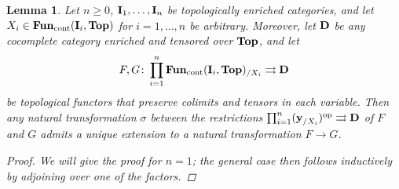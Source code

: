 \documentclass[reqno]{memo-l}
\theoremstyle{mythm}
\newtheorem{lemma}[thm]{Lemma}
\theoremstyle{definition}
\numberwithin{equation}{section}
\newcommand{\cat}[1]{\textbf{\textup{#1}}}
\newcommand{\op}{{\textup{op}}}
\newcommand{\cont}{\textup{cont}}
\begin{document}
\begin{lemma}\label{lemma:extend-nat-trafo}
    Let $n\ge0$, $\cat{I}_1,\dots,\cat{I}_n$ be topologically enriched categories, and let $X_i\in\cat{Fun}_\cont(\cat{I}_i,\cat{Top})$ for $i=1,\dots,n$ be arbitrary. Moreover, let $\cat{D}$ be any cocomplete category enriched and tensored over $\cat{Top}$, and let
    \[F,G\colon\prod_{i=1}^n\cat{Fun}_\cont(\cat{I}_i,\cat{Top})_{/X_i}\rightrightarrows\cat{D}\]
    be topological functors that preserve colimits and tensors in each variable. Then any natural transformation $\sigma$ between the restrictions $\prod_{i=1}^n(\cat{y}_{/X_i})^\op\rightrightarrows\cat{D}$ of $F$ and $G$ admits a unique extension to a natural transformation $F\to G$.
    \begin{proof}
        We will give the proof for $n=1$; the general case then follows inductively by adjoining over one of the factors.


\end{proof}
\end{lemma}
\end{document}

